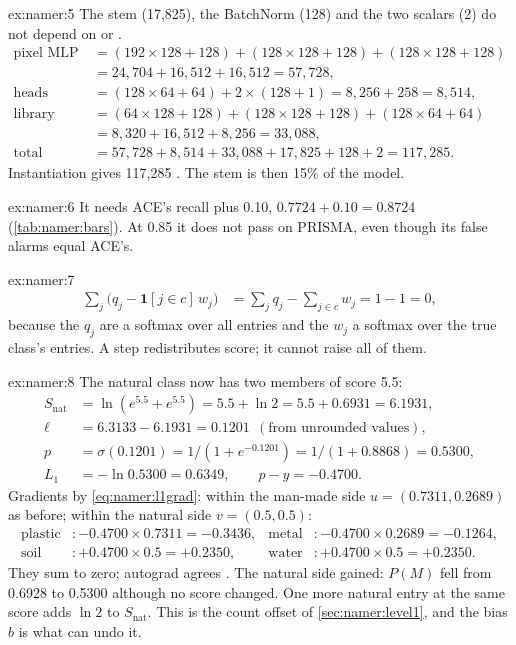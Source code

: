 \begin{solution}{ex:namer:5}
The stem (17,825), the BatchNorm (128) and the two scalars (2) do not depend on  or .
\begin{align*}
\text{pixel MLP} &= (192\times128+128)+(128\times128+128)+(128\times128+128)\\
&= 24{,}704+16{,}512+16{,}512 = 57{,}728,\\
\text{heads} &= (128\times64+64)+2\times(128+1) = 8{,}256+258 = 8{,}514,\\
\text{library MLP} &= (64\times128+128)+(128\times128+128)+(128\times64+64)\\
&= 8{,}320+16{,}512+8{,}256 = 33{,}088,\\
\text{total} &= 57{,}728+8{,}514+33{,}088+17{,}825+128+2 = 117{,}285 .
\end{align*}
Instantiation gives 117,285 \tagC. The stem is then 15\% of the model.
\end{solution}

\begin{solution}{ex:namer:6}
It needs ACE's recall plus 0.10, $0.7724+0.10=0.8724$ (\cref{tab:namer:bars}). At 0.85 it does not pass on PRISMA, even
though its false alarms equal ACE's.
\end{solution}

\begin{solution}{ex:namer:7}
\begin{align*}
\sum_j\big(q_j-\mathbf{1}[j\in c]\,w_j\big) &= \sum_j q_j-\sum_{j\in c}w_j = 1-1 = 0,
\end{align*}
because the $q_j$ are a softmax over all entries and the $w_j$ a softmax over the true class's entries. A step
redistributes score; it cannot raise all of them.
\end{solution}

\begin{solution}{ex:namer:8}
The natural class now has two members of score 5.5:
\begin{align*}
S_{\text{nat}} &= \ln(e^{5.5}+e^{5.5}) = 5.5+\ln2 = 5.5+0.6931 = 6.1931,\\
\ell &= 6.3133-6.1931 = 0.1201\ \ (\text{from unrounded values}),\\
p &= \sigma(0.1201) = 1/(1+e^{-0.1201}) = 1/(1+0.8868) = 0.5300,\\
L_1 &= -\ln0.5300 = 0.6349,\qquad p-y = -0.4700 .
\end{align*}
Gradients by \cref{eq:namer:l1grad}: within the man-made side $u=(0.7311,0.2689)$ as before; within the natural side
$v=(0.5,0.5)$:
\begin{align*}
\text{plastic} &: -0.4700\times0.7311 = -0.3436, & \text{metal} &: -0.4700\times0.2689 = -0.1264,\\
\text{soil} &: +0.4700\times0.5 = +0.2350, & \text{water} &: +0.4700\times0.5 = +0.2350 .
\end{align*}
They sum to zero; autograd agrees \tagC. The natural side gained: $P(M)$ fell from 0.6928 to 0.5300 although no score
changed. One more natural entry at the same score adds $\ln2$ to $S_{\text{nat}}$. This is the count offset of
\cref{sec:namer:level1}, and the bias $b$ is what can undo it.
\end{solution}

